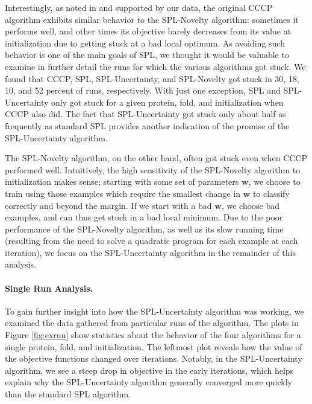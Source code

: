 \documentclass{article}
\begin{document}
Interestingly, as noted in \cite{SPL} and supported by our data, the original CCCP algorithm exhibits similar behavior to the SPL-Novelty algorithm: sometimes it performs well, and other times its objective barely decreases from its value at initialization due to getting stuck at a bad local optimum. As avoiding such behavior is one of the main goals of SPL, we thought it would be valuable to examine in further detail the runs for which the various algorithms got stuck. We found that CCCP, SPL, SPL-Uncertainty, and SPL-Novelty got stuck in 30, 18, 10, and 52 percent of runs, respectively. With just one exception, SPL and SPL-Uncertainty only got stuck for a given protein, fold, and initialization when CCCP also did. The fact that SPL-Uncertainty got stuck only about half as frequently as standard SPL provides another indication of the promise of the SPL-Uncertainty algorithm. 

The SPL-Novelty algorithm, on the other hand, often got stuck even when CCCP performed well. Intuitively, the high sensitivity of the SPL-Novelty algorithm to initialization makes sense; starting with some set of parameters $\textbf{w}$, we choose to train using those examples which require the smallest change in $\textbf{w}$ to classify correctly and beyond the margin. If we start with a bad $\textbf{w}$, we choose bad examples, and can thus get stuck in a bad local minimum. Due to the poor performance of the SPL-Novelty algorithm, as well as its slow running time (resulting from the need to solve a quadratic program for each example at each iteration), we focus on the SPL-Uncertainty algorithm in the remainder of this analysis.

\paragraph{Single Run Analysis.}  To gain further insight into how the SPL-Uncertainty algorithm was working, we examined the data gathered  from particular runs of the algorithm. The plots in Figure \ref{fig:exrun} show statistics about the behavior of the four algorithms for a single protein, fold, and initialization. The leftmost plot reveals how the value of the objective functions changed over iterations. Notably, in the SPL-Uncertainty algorithm, we see a steep drop in objective in the early iterations, which helps explain why the SPL-Uncertainty algorithm generally converged more quickly than the standard SPL algorithm. 
\end{document}

